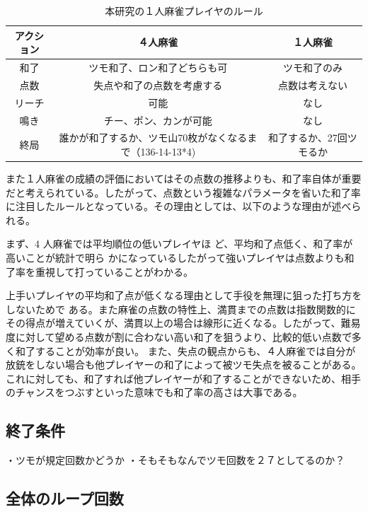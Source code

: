 \begin{table}[htbp]
  \caption{本研究の１人麻雀プレイヤのルール}
  \label{tb:bakuuti_score}
  \begin{center}
  \begin{tabular}{c|c|c}
    \hline
    アクション  & ４人麻雀 & １人麻雀 \\\hline\hline
    和了  & ツモ和了、ロン和了どちらも可 & ツモ和了のみ\\\hline
    点数 & 失点や和了の点数を考慮する & 点数は考えない\\\hline
    リーチ & 可能 & なし\\\hline
    鳴き & チー、ポン、カンが可能 & なし\\\hline
    終局 & 誰かが和了するか、ツモ山70枚がなくなるまで（136-14-13*4) & 和了するか、27回ツモるか\\\hline
  \end{tabular}\end{center}
\end{table}

また１人麻雀の成績の評価においてはその点数の推移よりも、和了率自体が重要だと考えられている。したがって、点数という複雑なパラメータを省いた和了率に注目したルールとなっている。その理由としては、以下のような理由が述べられる。

まず、4 人麻雀では平均順位の低いプレイヤほ ど、平均和了点低く、和了率が高いことが統計で明ら かになっている\cite{kagaku}したがって強いプレイヤは点数よりも和了率を重視して打っていることがわかる。

上手いプレイヤの平均和了点が低くなる理由として手役を無理に狙った打ち方をしないためで
ある。また麻雀の点数の特性上、満貫までの点数は指数関数的にその得点が増えていくが、満貫以上の場合は線形に近くなる。したがって、難易度に対して望める点数が割に合わない高い和了を狙うより、比較的低い点数で゙多く和了することが効率が良い。
また、失点の観点からも、４人麻雀では自分が放銃をしない場合も他プレイヤーの和了によって被ツモ失点を被ることがある。これに対しても、和了すれば他プレイヤーが和了することができないため、相手のチャンスをつぶすといった意味でも和了率の高さは大事である。

\subsection{終了条件}
・ツモが規定回数かどうか
・そもそもなんでツモ回数を２７としてるのか？



\subsection{全体のループ回数}

